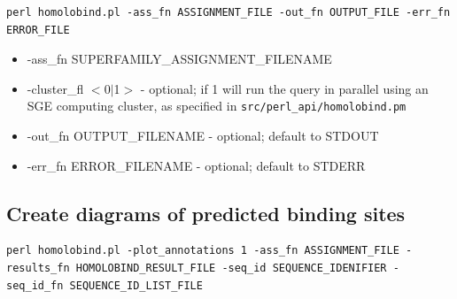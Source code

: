 \documentclass[11pt]{article}
\begin{document}
\lstset{breaklines=true,language=bash,breakatwhitespace=true}
\lstset{frame=single}
\lstset{basicstyle=\ttfamily}
\begin{lstlisting}
perl homolobind.pl -ass_fn ASSIGNMENT_FILE -out_fn OUTPUT_FILE -err_fn ERROR_FILE
\end{lstlisting}


\begin{itemize}
\item -ass\_fn SUPERFAMILY\_ASSIGNMENT\_FILENAME
\item -cluster\_fl $<$0$|$1$>$ - optional; if 1 will run the query in parallel using an SGE computing cluster, as specified in {\tt src/perl\_api/homolobind.pm}
\item -out\_fn OUTPUT\_FILENAME - optional; default to STDOUT
\item -err\_fn ERROR\_FILENAME - optional; default to STDERR
\end{itemize}


\subsection{Create diagrams of predicted binding sites}

\lstset{breaklines=true,language=bash,breakatwhitespace=true}
\lstset{frame=single}
\lstset{basicstyle=\ttfamily}
\begin{lstlisting}
perl homolobind.pl -plot_annotations 1 -ass_fn ASSIGNMENT_FILE -results_fn HOMOLOBIND_RESULT_FILE -seq_id SEQUENCE_IDENIFIER -seq_id_fn SEQUENCE_ID_LIST_FILE
\end{lstlisting}
\end{document}

